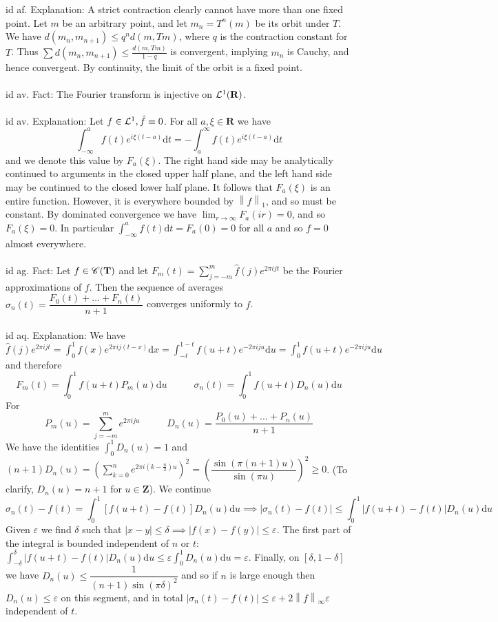 \documentclass[oneside]{book}
\newcommand{\eps}{\varepsilon}
\newcommand{\Z}{\mathbf{Z}}
\newcommand{\R}{\mathbf{R}}
\newcommand{\T}{\mathbf{T}}
\newcommand{\fit}[1]{\left( #1\right)}
\newcommand{\abs}[1]{\left\lvert #1\right\rvert}
\newcommand{\norm}[1]{\left\lVert #1\right\rVert}
\renewcommand{\d}{\mathrm{d}}
\begin{document}
id af. Explanation: A strict contraction clearly cannot have more than one fixed point. Let $m$ be an arbitrary point, and let $m_n=T^n(m)$ be its orbit under $T$. We have $d(m_n,m_{n+1})\le q^{n}d(m,Tm)$, where $q$ is the contraction constant for $T$. Thus $\sum d(m_n,m_{n+1}) \le \frac{d(m,Tm)}{1-q}$ is convergent, implying $m_n$ is Cauchy, and hence convergent. By continuity, the limit of the orbit is a fixed point.  \\\\


id av. Fact: The Fourier transform is injective on $\LL^1(\R)$.     \\\\


id av. Explanation: Let $f\in\mathcal{L}^1, \hat{f}\equiv 0$. For all $a,\xi\in\R$ we have
$$\int_{-\infty}^a f(t)e^{i\xi(t-a)}\d t=-\int_a^\infty f(t)e^{i\xi(t-a)}\d t$$
and we denote this value by $F_a(\xi)$. The right hand side may be analytically continued to arguments in the closed upper half plane, and the left hand side may be continued to the closed lower half plane. It follows that $F_a(\xi)$ is an entire function. However, it is everywhere bounded by $\norm{f}_1$, and so must be constant. By dominated convergence we have $\lim_{r\to\infty} F_a(ir)=0$, and so $F_a(\xi)=0$. In particular $\int_{-\infty}^a f(t)\d t=F_a(0)=0$ for all $a$ and so $f=0$ almost everywhere.    \\\\


id ag. Fact: Let $f\in\CC(\T)$ and let $F_m(t)=\displaystyle\sum_{j=-m}^m \hat{f}(j) e^{2\pi i jt}$ be the Fourier approximations of $f$. Then the sequence of averages $\sigma_n(t)=\dfrac{F_0(t)+\dots +F_n(t)}{n+1}$ converges uniformly to $f$. \\\\


id aq. Explanation: We have
$\hat{f}(j)e^{2\pi ijt}=\int_0^1 f(x)e^{2\pi i j(t-x)}\d x=\int_{-t}^{1-t}f(u+t)e^{-2\pi i j u}\d u=\int_{0}^{1}f(u+t)e^{-2\pi i j u}\d u$
and therefore 
$$F_m(t)=\int_0^1 f(u+t) P_m(u)\d u \phantom{---} \sigma_n(t)=\int_0^1 f(u+t) D_n(u)\d u $$
For
$$P_m(u)=\sum_{j=-m}^m e^{2\pi i j u} \phantom{---} D_n(u)=\dfrac{P_0(u)+\dots+P_n(u)}{n+1}$$
We have the identities $\displaystyle \int_0^1 D_n(u)=1$ and
$\displaystyle (n+1)D_n(u)=\fit{\sum_{k=0}^n e^{2\pi i(k-\frac{n}{2})u}}^2=\fit{\dfrac{\sin(\pi(n+1)u)}{\sin(\pi u)}}^2\ge0$. (To clarify, $D_n(u)=n+1$ for $u\in\Z$).
We continue
$$\sigma_n(t)-f(t)=\int_0^1  [f(u+t)-f(t)] D_n(u)\d u\implies \abs{\sigma_n(t)-f(t)}\le\int_0^1  \abs{f(u+t)-f(t)} D_n(u)\d u $$
Given $\eps$ we find $\delta$ such that
$\abs{x-y}\le\delta\implies\abs{f(x)-f(y)}\le\eps$.
The first part of the integral is bounded independent of $n$ or $t$: $ \int_{-\delta}^{\delta}  \abs{f(u+t)-f(t)} D_n(u)\d u\le \eps  \int_{0}^{1} D_n(u)\d u=\eps$. Finally, on $[\delta,1-\delta]$ we have $D_n(u)\le \dfrac{1}{(n+1)\sin(\pi\delta)^2}$
and so if $n$ is large enough then $D_n(u)\le \eps$ on this segment, and in total 
$\abs{\sigma_n(t)-f(t)}\le \eps+2\norm{f}_\infty\eps$
independent of $t$.
\end{document}
